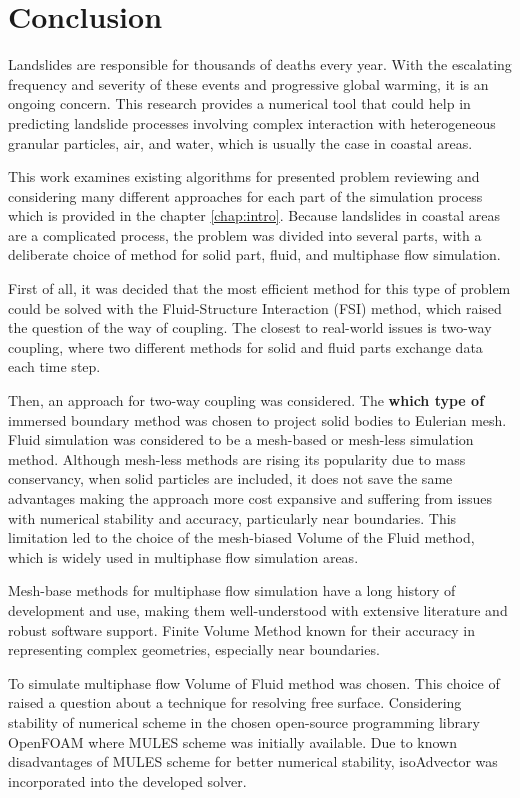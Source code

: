 \chapter{Conclusion} \label{chap:conclusion}
Landslides are responsible for thousands of deaths every year. With the escalating frequency and severity of these events and progressive global warming, it is an ongoing concern. This research provides a numerical tool that could help in predicting landslide processes involving complex interaction with heterogeneous granular particles, air, and water, which is usually the case in coastal areas. 

This work examines existing algorithms for presented problem reviewing and considering many different approaches for each part of the simulation process which is provided in the chapter \ref{chap:intro}. Because landslides in coastal areas are a complicated process, the problem was divided into several parts, with a deliberate choice of method for solid part, fluid, and multiphase flow simulation.

First of all, it was decided that the most efficient method for this type of problem could be solved with the Fluid-Structure Interaction (FSI) method, which raised the question of the way of coupling. The closest to real-world issues is two-way coupling, where two different methods for solid and fluid parts exchange data each time step.

Then, an approach for two-way coupling was considered. The \textbf{which type of } immersed boundary method was chosen to project solid bodies to Eulerian mesh. Fluid simulation was considered to be a mesh-based or mesh-less simulation method. Although mesh-less methods are rising its popularity due to mass conservancy, when solid particles are included, it does not save the same advantages making the approach more cost expansive and suffering from issues with numerical stability and accuracy, particularly near boundaries. This limitation led to the choice of the mesh-biased Volume of the Fluid method, which is widely used in multiphase flow simulation areas.

Mesh-base methods for multiphase flow simulation  have a long history of development and use, making them well-understood with extensive literature and robust software support. Finite Volume Method known for their accuracy in representing complex geometries, especially near boundaries. 

To simulate multiphase flow Volume of Fluid method was chosen. This choice of raised a question about a technique for resolving free surface. Considering stability of numerical scheme in the chosen open-source programming library OpenFOAM where MULES scheme was initially available. Due to known disadvantages of MULES scheme for better numerical stability, isoAdvector was incorporated into the developed solver.

